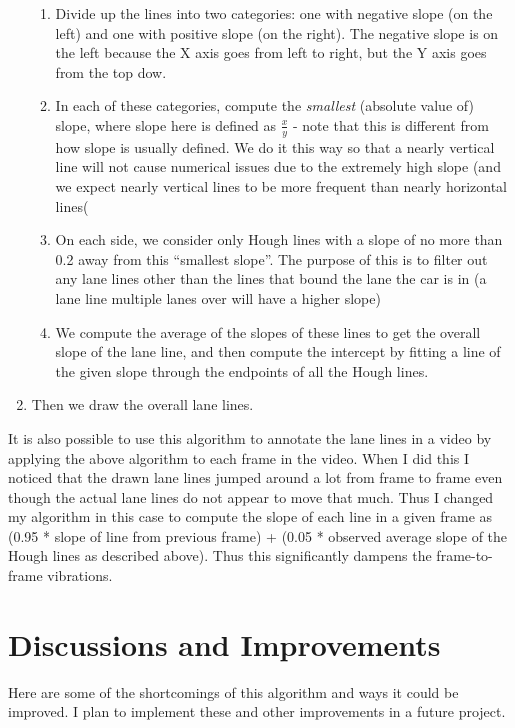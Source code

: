 \documentclass{article}
\begin{document}
\begin{enumerate}
\begin{enumerate}
\item Divide up the lines into two categories: one with negative slope (on the left) and one with positive slope (on the right). The negative slope is on the left because the X axis goes from left to right, but the Y axis goes from the top dow.
\item In each of these categories, compute the \emph{smallest} (absolute value of) slope, where slope here is defined as $\frac{x}{y}$ - note that this is different from how slope is usually defined. We do it this way so that a nearly vertical line will not cause numerical issues due to the extremely high slope (and we expect nearly vertical lines to be more frequent than nearly horizontal lines(
\item On each side, we consider only Hough lines with a slope of no more than 0.2 away from this ``smallest slope''. The purpose of this is to filter out any lane lines other than the lines that bound the lane the car is in (a lane line multiple lanes over will have a higher slope)
\item We compute the average of the slopes of these lines to get the overall slope of the lane line, and then compute the intercept by fitting a line of the given slope through the endpoints of all the Hough lines.
\end{enumerate}
\item Then we draw the overall lane lines.
\end{enumerate}

It is also possible to use this algorithm to annotate the lane lines in a video by applying the above algorithm to each frame in the video. When I did this I noticed that the drawn lane lines jumped around a lot from frame to frame even though the actual lane lines do not appear to move that much. Thus I changed my algorithm in this case to compute the slope of each line in a given frame as (0.95 * slope of line from previous frame) + (0.05 * observed average slope of the Hough lines as described above). Thus this significantly dampens the frame-to-frame vibrations.

\section{Discussions and Improvements}

Here are some of the shortcomings of this algorithm and ways it could be improved. I plan to implement these and other improvements in a future project.
\end{document}
